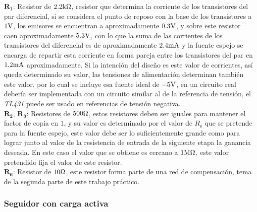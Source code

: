 $\bm{R_{1}}$: Resistor de $2.2 \si[per-mode=symbol]{\kilo\ohm}$, resistor que determina la corriente de los transistores del par diferencial, si se considera el punto de reposo con la base de los transistores a $1 \si[per-mode=symbol]{\volt}$, los emisores se encuentran a aproximadamente $0.3 \si[per-mode=symbol]{\volt}$, y sobre este resistor caen aproximadamente $5.3 \si[per-mode=symbol]{\volt}$, con lo que la suma de las corrientes de los transistores del diferencial es de aproximadamente $2.4 \si[per-mode=symbol]{\milli\ampere}$ y la fuente espejo se encarga de repartir esta corriente en forma pareja entre los transistores del par en $1.2 \si[per-mode=symbol]{\milli\ampere}$ aproximadamente. Si la intención del diseño es este valor de corrientes, así queda determinado su valor, las tensiones de alimentación determinan también este valor, por lo cual se incluye esa fuente ideal de $-5 \si[per-mode=symbol]{\volt}$, en un circuito real debería ser implementada con un circuito similar al de la referencia de tensión, el \textit{TL431} puede ser usado en referencias de tensión negativa.\\

$\bm{R_{2}}$, $\bm{R_{3}}$: Resistores de $500 \si[per-mode=symbol]{\ohm}$, estos resistores deben ser iguales para mantener el factor de copia en $1$, y su valor es determinado por el valor de $R_{o}$ que se pretende para la fuente espejo, este valor debe ser lo suficientemente grande como para lograr junto al valor de la resistencia de entrada de la siguiente etapa la ganancia deseada. En este caso el valor que se obtiene es cercano a $1 \si[per-mode=symbol]{\mega\ohm}$, este valor pretendido fija el valor de este resistor.\\

$\bm{R_{6}}$: Resistor de $10 \si[per-mode=symbol]{\ohm}$, este resistor forma parte de una red de compensación, tema de la segunda parte de este trabajo práctico.\\


\subsubsection{Seguidor con carga activa}

